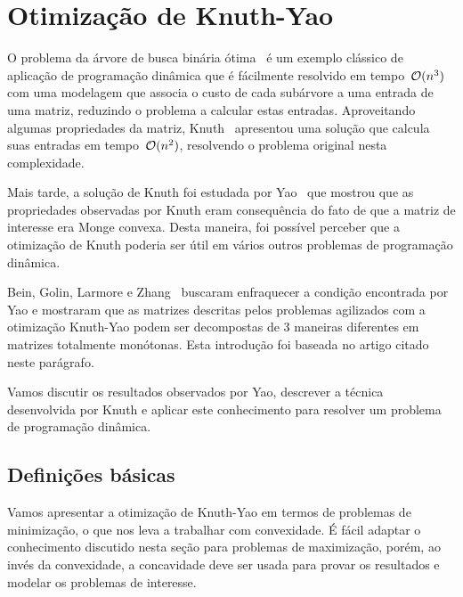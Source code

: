 \section{Otimização de Knuth-Yao}
\label{KY}


O problema da árvore de busca binária ótima~\cite{CLRS} é um exemplo clássico de aplicação de programação dinâmica que é fácilmente resolvido em tempo~$\mathcal{O}(n^3)$ com uma modelagem que associa o custo de cada subárvore a uma entrada de uma matriz, reduzindo o problema a calcular estas entradas. Aproveitando algumas propriedades da matriz, Knuth~\cite{Knuth:1971} apresentou uma solução que calcula suas entradas em tempo~$\mathcal{O}(n^2)$, resolvendo o problema original nesta complexidade.

Mais tarde, a solução de Knuth foi estudada por Yao~\cite{Yao:1980,Yao:1982} que mostrou que as propriedades observadas por Knuth eram consequência do fato de que a matriz de interesse era Monge convexa. Desta maneira, foi possível perceber que a otimização de Knuth poderia ser útil em vários outros problemas de programação dinâmica. 

Bein, Golin, Larmore e Zhang~\cite{Bein:2009} buscaram enfraquecer a condição encontrada por Yao e mostraram que as matrizes descritas pelos problemas agilizados com a otimização Knuth-Yao podem ser decompostas de 3 maneiras diferentes em matrizes totalmente monótonas. Esta introdução foi baseada no artigo citado neste parágrafo.

Vamos discutir os resultados observados por Yao, descrever a técnica desenvolvida por Knuth e aplicar este conhecimento para resolver um problema de programação dinâmica.


\subsection{Definições básicas} \label{KY:defs}

Vamos apresentar a otimização de Knuth-Yao em termos de problemas de minimização, o que nos leva a trabalhar com convexidade. É fácil adaptar o conhecimento discutido nesta seção para problemas de maximização, porém, ao invés da convexidade, a concavidade deve ser usada para provar os resultados e modelar os problemas de interesse.

